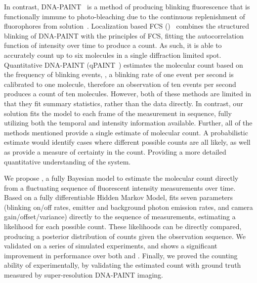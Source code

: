 %
In contrast, DNA-PAINT~\citep{schnitzbauer_2017} is a method of producing
blinking fluorescence that is functionally immune to photo-bleaching due to the
continuous replenishment of fluorophores from solution~\citep{stehr_2021}.
  Localization based FCS (\lbfcs)~\citep{stein_2019,stein_2021} combines the
  structured blinking of DNA-PAINT with the principles of FCS, fitting the
  autocorrelation function of intensity over time to produce a count. As such,
  it is able to accurately count up to six molecules in a single diffraction
  limited spot.
  Quantitative DNA-PAINT (qPAINT~\citep{jungmann_2016}) estimates the molecular
  count based on the frequency of blinking events, \ie, a blinking rate of one
  event per second is calibrated to one molecule, therefore an observation of
  ten events per second produces a count of ten molecules.
  However, both of these methods are limited in that they fit summary
  statistics, rather than the data directly.
  In contrast, our solution fits the model to each frame of the measurement 
  in sequence, fully utilizing both the temporal and intensity information available.
  Further, all of the methods mentioned provide a single estimate of molecular count. 
  A probabilistic estimate would identify cases where different possible counts are all likely,
  as well as provide a measure of certainty in the count. Providing a more detailed quantitative 
  understanding of the system. 

We propose \ours, a fully Bayesian model to estimate the molecular count
directly from a fluctuating sequence of fluorescent intensity measurements over
time.
  Based on a fully differentiable Hidden Markov Model, \ours fits
  seven parameters (blinking on/off rates, emitter and background photon emission rates, 
  and camera gain/offset/variance) directly to the sequence of measurements, 
  estimating a likelihood for each possible count.
  These likelihoods can be directly compared, producing a posterior
  distribution of counts given the observation sequence.
  We validated \ours on a series of simulated experiments, and shows a
  significant improvement in performance over both \lbfcs and \qpaint.
  Finally, we proved the counting ability of \ours experimentally, by validating 
  the estimated count with ground truth measured by super-resolution DNA-PAINT imaging.

